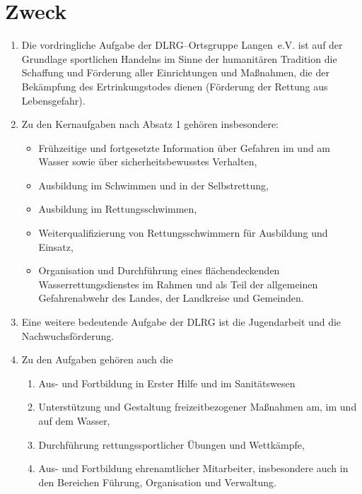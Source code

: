 \documentclass[%
12pt, %
a4paper, %
headsepline, %
footsepline, %
parskip, %
headings=normal, %
]{scrartcl}
\begin{document}
\section{Zweck}
\label{sec:zweck}
\begin{enumerate}
    \item Die vordringliche Aufgabe der DLRG--Ortsgruppe Langen~e.V. ist auf der Grundlage sportlichen Handelns im Sinne der humanitären Tradition die Schaffung und Förderung aller Einrichtungen und Maßnahmen, die der Bekämpfung des Ertrinkungstodes dienen (Förderung der Rettung aus Lebensgefahr).
    \item Zu den Kernaufgaben nach Absatz 1 gehören insbesondere:\begin{itemize}
        \item Frühzeitige und fortgesetzte Information über Gefahren im und am Wasser sowie über sicherheitsbewusstes Verhalten,
        \item Ausbildung im Schwimmen und in der Selbstrettung,
        \item Ausbildung im Rettungsschwimmen,
        \item Weiterqualifizierung von Rettungsschwimmern für Ausbildung und Einsatz,
        \item Organisation und Durchführung eines flächendeckenden Wasserrettungsdienstes im Rahmen und als Teil der allgemeinen Gefahrenabwehr des Landes, der Landkreise und Gemeinden.
      \end{itemize}
    \item Eine weitere bedeutende Aufgabe der DLRG ist die Jugendarbeit und die Nachwuchsförderung.
    \item Zu den Aufgaben gehören auch die \begin{enumerate}[noitemsep]
        \item Aus- und Fortbildung in Erster Hilfe und im Sanitätswesen
        \item Unterstützung und Gestaltung freizeitbezogener Maßnahmen am, im und auf dem Wasser,
        \item Durchführung rettungssportlicher Übungen und Wettkämpfe,
        \item Aus- und Fortbildung ehrenamtlicher Mitarbeiter, insbesondere auch in den Bereichen Führung, Organisation und Verwaltung.
      \end{enumerate}

\end{enumerate}
\end{document}

